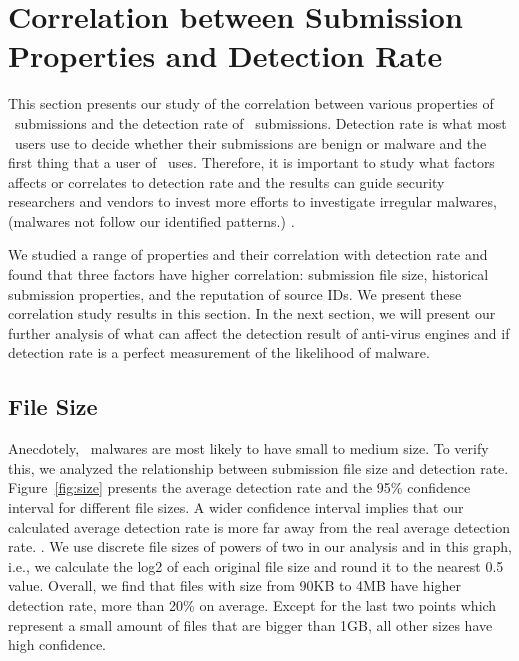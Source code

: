 \section{Correlation between Submission Properties and Detection Rate}
\label{sec:corr}
This section presents our study of the correlation between various properties of \pe\ submissions and the detection rate of \pe\ submissions.
Detection rate is what most \vt\ users use to decide whether their submissions are benign or malware 
and the first thing that a user of \vt\ uses.
Therefore, it is important to study what factors affects or correlates to detection rate
and the results can guide security researchers and vendors to invest 
{\color{red} more efforts to investigate irregular malwares, (malwares not follow our identified patterns.)}
. 

We studied a range of properties and their correlation with detection rate
and found that three factors have higher correlation:
submission file size,
historical submission properties, and the reputation of source IDs.
We present these correlation study results in this section.
In the next section, we will present our further analysis of what can affect the detection result of anti-virus engines
and if detection rate is a perfect measurement of the likelihood of malware.

%



\subsection{File Size}
\label{sec:size}
Anecdotely, \pe\ malwares are most likely to have small to medium size. 
To verify this, we analyzed the relationship between submission file size and detection rate. 
Figure~\ref{fig:size} presents the average detection rate and 
the 95\% confidence interval for different file sizes.
A wider confidence interval implies that
{\color{red} our calculated average detection rate is more far away from the real average detection rate.}
.
We use discrete file sizes of powers of two in our analysis and in this graph,
i.e., we calculate the log2 of each original file size and round it to the nearest 0.5 value.
Overall, we find that files with size from 90KB to 4MB have higher detection rate, more than 20\% on average. 
Except for the last two points which represent a small amount of files that are bigger than 1GB, 
all other sizes have high confidence.   

